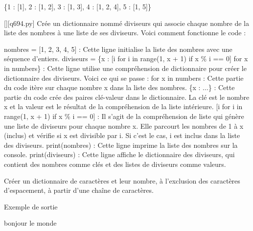 \{1 : [1], 2 : [1, 2], 3 : [1, 3], 4 : [1, 2, 4], 5 : [1, 5]\}
        \par
        \begin{solution}
            \renewcommand{\nomfichier}{q694.py}
            \pythonfile{\chemincode \nomfichier}[][\nomfichier]
            Crée un dictionnaire nommé diviseurs qui associe chaque nombre de la liste des nombres à une liste de ses diviseurs. Voici comment fonctionne le code :

    nombres = [1, 2, 3, 4, 5] : Cette ligne initialise la liste des nombres avec une séquence d'entiers.
    diviseurs = \{x : [i for i in range(1, x + 1) if x \% i == 0] for x in numbers\} : Cette ligne utilise une compréhension de dictionnaire pour créer le dictionnaire des diviseurs. Voici ce qui se passe :
        for x in numbers : Cette partie du code itère sur chaque nombre x dans la liste des nombres.
        \{x : ...\} : Cette partie du code crée des paires clé-valeur dans le dictionnaire. La clé est le nombre x et la valeur est le résultat de la compréhension de la liste intérieure.
        [i for i in range(1, x + 1) if x \% i == 0] : Il s'agit de la compréhension de liste qui génère une liste de diviseurs pour chaque nombre x. Elle parcourt les nombres de 1 à x (inclus) et vérifie si x est divisible par i. Si c'est le cas, i est inclus dans la liste des diviseurs.
    print(nombres) : Cette ligne imprime la liste des nombres sur la console.
    print(diviseurs) : Cette ligne affiche le dictionnaire des diviseurs, qui contient des nombres comme clés et des listes de diviseurs comme valeurs.
        \end{solution}
        

        \question
        Créer un dictionnaire de caractères et leur nombre, à l'exclusion des caractères d'espacement, à partir d'une chaîne de caractères.

Exemple de sortie

bonjour le monde

